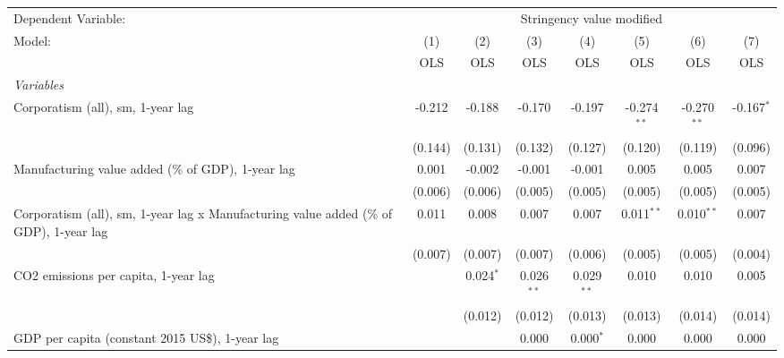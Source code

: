 
\begingroup
\centering
\begin{tabular}{lccccccc}
   \toprule
   Dependent Variable: & \multicolumn{7}{c}{Stringency value modified}\\
   Model:                                                                                 & (1)     & (2)         & (3)          & (4)          & (5)           & (6)           & (7)\\  
                                                                                          &  OLS    & OLS         & OLS          & OLS          & OLS           & OLS           & OLS\\  
   \midrule
   \emph{Variables}\\
   Corporatism (all), sm, 1-year lag                                                      & -0.212  & -0.188      & -0.170       & -0.197       & -0.274$^{**}$ & -0.270$^{**}$ & -0.167$^{*}$\\   
                                                                                          & (0.144) & (0.131)     & (0.132)      & (0.127)      & (0.120)       & (0.119)       & (0.096)\\   
   Manufacturing value added (\% of GDP), 1-year lag                                      & 0.001   & -0.002      & -0.001       & -0.001       & 0.005         & 0.005         & 0.007\\   
                                                                                          & (0.006) & (0.006)     & (0.005)      & (0.005)      & (0.005)       & (0.005)       & (0.005)\\   
   Corporatism (all), sm, 1-year lag x Manufacturing value added (\% of GDP), 1-year lag  & 0.011   & 0.008       & 0.007        & 0.007        & 0.011$^{**}$  & 0.010$^{**}$  & 0.007\\   
                                                                                          & (0.007) & (0.007)     & (0.007)      & (0.006)      & (0.005)       & (0.005)       & (0.004)\\   
   CO2 emissions per capita, 1-year lag                                                   &         & 0.024$^{*}$ & 0.026$^{**}$ & 0.029$^{**}$ & 0.010         & 0.010         & 0.005\\   
                                                                                          &         & (0.012)     & (0.012)      & (0.013)      & (0.013)       & (0.014)       & (0.014)\\   
   GDP per capita (constant 2015 US\$), 1-year lag                                        &         &             & 0.000        & 0.000$^{*}$  & 0.000         & 0.000         & 0.000\\   

\end{tabular}
